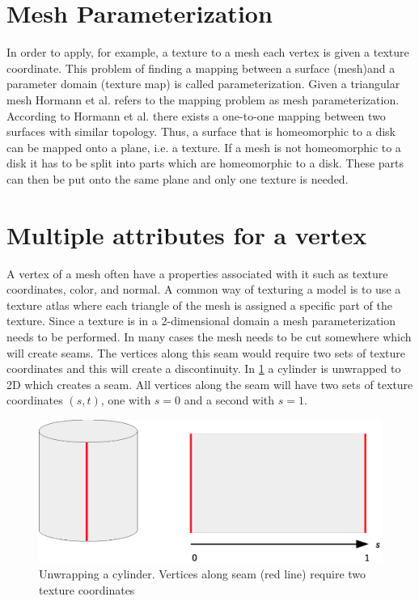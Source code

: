 \section{Mesh Parameterization} \label{sec:mesh_parametrization}
In order to apply, for example, a texture to a mesh each vertex is given a texture coordinate. This problem of finding a mapping between a surface (mesh)and a parameter domain (texture map) is called parameterization. Given a triangular mesh Hormann et al. \cite{hormann2007mesh} refers to the mapping problem as mesh parameterization. According to Hormann et al. there exists a one-to-one mapping between two surfaces with similar topology. Thus, a surface that is homeomorphic to a disk can be mapped onto a plane, i.e. a texture. If a mesh is not homeomorphic to a disk it has to be split into parts which are homeomorphic to a disk. These parts can then be put onto the same plane and only one texture is needed.

\section{Multiple attributes for a vertex} \label{sec:vertex_with_multi_attributes}
A vertex of a mesh often have a properties associated with it such as texture coordinates, color, and normal. A common way of texturing a model is to use a texture atlas where each triangle of the mesh is assigned a specific part of the texture. Since a texture is in a 2-dimensional domain a mesh parameterization needs to be performed. In many cases the mesh needs to be cut somewhere which will create seams. The vertices along this seam would require two sets of texture coordinates and this will create a discontinuity. In \cref{fig:cylinder_unwrap} a cylinder is unwrapped to 2D which creates a seam. All vertices along the seam will have two sets of texture coordinates $(s,t)$, one with $s=0$ and a second with $s=1$.


\begin{figure}[ht]
    \centering
    \includegraphics[width=.8\textwidth]{figures/cylinder_unwrap.eps}
    \caption{Unwrapping a cylinder. Vertices along seam (red line) require two texture coordinates}
    \label{fig:cylinder_unwrap}
\end{figure}


